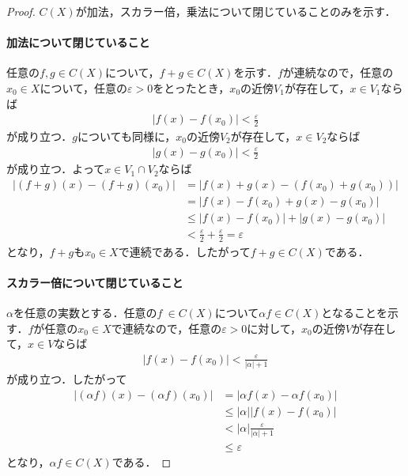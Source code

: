 \documentclass[../main.tex]{subfiles}
\begin{document}
\begin{proof} \(C(X)\)が加法，スカラー倍，乗法について閉じていることのみを示す．

\paragraph{加法について閉じていること} 任意の\(f, g \in C(X)\)について，\(f + g \in C(X)\)を示す．\(f\)が連続なので，任意の\(x_0 \in X\)について，任意の\(\varepsilon > 0\)をとったとき，\(x_0\)の近傍\(V_1\)が存在して，\(x \in V_1\)ならば
\begin{align*}
    \lvert f(x) - f(x_0) \rvert < \frac{\varepsilon}{2}
\end{align*}
が成り立つ．\(g\)についても同様に，\(x_0\)の近傍\(V_2\)が存在して，\(x \in V_2\)ならば
\begin{align*}
    \lvert g(x) - g(x_0) \rvert < \frac{\varepsilon}{2}
\end{align*}
が成り立つ．よって\(x \in V_1 \cap V_2\)ならば
\begin{align*}
  \lvert (f + g)(x) - (f + g)(x_0) \rvert
  &= |f(x) + g(x) - (f(x_0) + g(x_0))| \\
  &= |f(x) - f(x_0) + g(x) - g(x_0)| \\
  &\leq |f(x) - f(x_0) | + | g(x) - g(x_0)| \\
  &< \frac{\varepsilon}{2} + \frac{\varepsilon}{2} = \varepsilon
\end{align*}
となり，\(f + g\)も\(x_0 \in X\)で連続である．したがって\(f + g \in C(X)\)である．

\paragraph{スカラー倍について閉じていること} \(\alpha\)を任意の実数とする．任意の\(f \ \in C(X)\)について\(\alpha f \in C(X)\)となることを示す．\(f\)が任意の\(x_0 \in X\)で連続なので，任意の\(\varepsilon > 0\)に対して，\(x_0\)の近傍\(V\)が存在して，\(x \in V\)ならば
\begin{align*}
  |f(x) - f(x_0)| < \frac{\varepsilon}{\lvert \alpha \rvert + 1}
\end{align*}
が成り立つ．したがって
\begin{align*}
  |(\alpha f)(x) - (\alpha f)(x_0)|
  &= |\alpha f(x) - \alpha f(x_0)| \\
  &\leq |\alpha | |f(x) - f(x_0)| \\
  &< |\alpha | \frac{\varepsilon}{|\alpha| + 1} \\
  & \leq \varepsilon
\end{align*}
となり，\(\alpha f \in C(X)\)である．


\end{proof}
\end{document}
